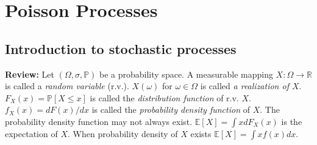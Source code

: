 \documentclass[all-lectures.tex]{subfiles}
\author{}
\begin{document}

\chapter{Poisson Processes}
\setcounter{section}{0}
\setcounter{subsection}{0}
\section*{}
\chr
\section{Introduction to stochastic processes}

\indent \textbf{Review:} Let $(\Omega,\sigma,\mathbb{P})$ be a probability space. A measurable mapping $X:\Omega \to \mathbb{R}$ is called a \textit{random variable} (r.v.). $X(\omega)$ for $\omega \in \Omega$ is called \textit{a realization of $X$}. $F_X (x) = \mathbb{P}[X\leq x]$ is called the \textit{distribution function} of r.v. $X$. $f_X(x) = dF(x)/dx$ is called the \textit{probability density function} of $X$. The probability density function may not always exist. $\mathbb{E}[X] = \int x dF_X(x) $ is the expectation of $X$. When probability density of $X$ exists $\mathbb{E}[X] = \int xf(x)dx$.\\
\end{document}
